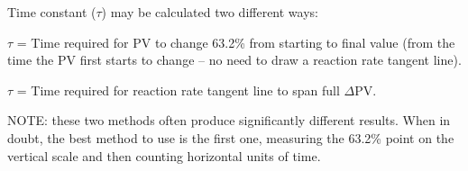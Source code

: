\vskip 10pt


Time constant ($\tau$) may be calculated two different ways:
 
\vskip 10pt

$\tau$ = Time required for PV to change 63.2\% from starting to final value (from the time the PV first starts to change -- no need to draw a reaction rate tangent line).
 
\vskip 10pt

$\tau$ = Time required for reaction rate tangent line to span full $\Delta$PV.

\vskip 10pt

NOTE: these two methods often produce significantly different results.  When in doubt, the best method to use is the first one, measuring the 63.2\% point on the vertical scale and then counting horizontal units of time.




